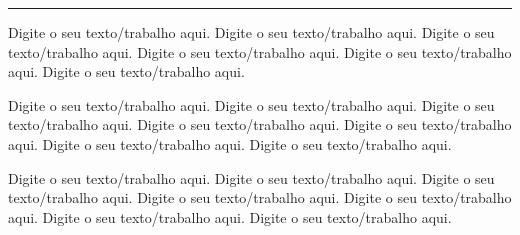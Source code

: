 \documentclass[12pt,a4paper]{article}
\begin{document}
\begin{minipage}{12cm}
\end{minipage}
\logo\hrule
{}
\newline

\begin{linenumbers}
Digite o seu texto/trabalho aqui. Digite o seu texto/trabalho aqui. Digite o seu texto/trabalho aqui. Digite o seu texto/trabalho aqui. Digite o seu texto/trabalho aqui. Digite o seu texto/trabalho aqui. 

Digite o seu texto/trabalho aqui. Digite o seu texto/trabalho aqui. Digite o seu texto/trabalho aqui. Digite o seu texto/trabalho aqui. Digite o seu texto/trabalho aqui. Digite o seu texto/trabalho aqui. Digite o seu texto/trabalho aqui. 

Digite o seu texto/trabalho aqui. Digite o seu texto/trabalho aqui. Digite o seu texto/trabalho aqui. Digite o seu texto/trabalho aqui. Digite o seu texto/trabalho aqui. Digite o seu texto/trabalho aqui. Digite o seu texto/trabalho aqui. 

\end{linenumbers}
\end{document}
